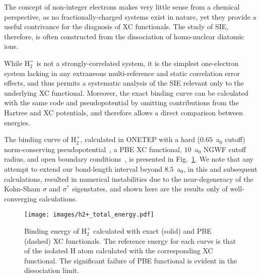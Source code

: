 The concept of non-integer electrons  
makes very little sense from a chemical perspective, 
as no fractionally-charged systems exist in nature, 
yet they provide a useful contrivance  
for the diagnosis of XC functionals.
%
The study of SIE, therefore, 
is often {constructed} from the dissociation
of homo-nuclear diatomic ions.
%
{While H$_2^+$ is not a strongly-correlated system, 
it is the simplest 
one-electron system lacking in any  
extraneous multi-reference 
and static correlation error effects, 
and thus permits a systematic analysis 
of the SIE relevant only to 
the underlying XC functional.
%
Moreover, 
the exact binding curve can be calculated  
with the same code and pseudopotential 
by omitting contributions 
from the Hartree and XC potentials, 
and therefore allows a direct 
comparison between energies.

The binding curve of H$_2^+$, 
calculated in {\sc ONETEP}
with a hard ($0.65$~a$_0$ cutoff) 
norm-conserving pseudopotential~\cite{PhysRevB.41.1227}, 
{a PBE XC functional}, 
$10$~a$_0$ NGWF cutoff radius, 
and open boundary conditions~\cite{:/content/aip/journal/jcp/110/6/10.1063/1.477923}, 
is presented in Fig.~\ref{fig:h2+_total_energy}.
%
{We note that any attempt to extend our 
bond-length interval beyond $8.5$~a$_0$, 
in this and subsequent calculations, 
resulted in numerical instabilities 
due to the near-degeneracy of 
the Kohn-Sham $\sigma$ and $\sigma^*$ 
eigenstates, and shown here are  the results only
of well-converging calculations.}


\begin{figure}[th!]
\centering
\texttt{[image: images/h2+\_total\_energy.pdf]}
\caption[Binding energy curve of H$_2^+$]
{Binding energy of H$_2^+$ 
calculated with exact (solid) and PBE (dashed) XC functionals.
%
{The reference energy for each curve 
is that of the  isolated H atom calculated with 
the corresponding XC functional.}
%
The significant failure of PBE functional 
is evident in the dissociation limit.}
\label{fig:h2+_total_energy}
\end{figure}
%


}
